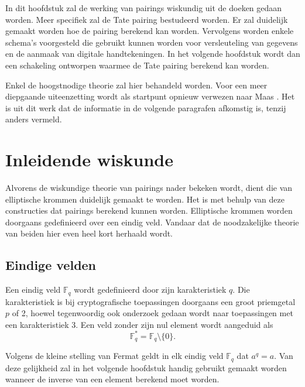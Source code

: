 
In dit hoofdstuk zal de werking van pairings wiskundig uit de doeken gedaan worden. Meer specifiek zal de Tate pairing bestudeerd worden. Er zal duidelijk gemaakt worden hoe de pairing berekend kan worden. Vervolgens worden enkele schema's voorgesteld die gebruikt kunnen worden voor versleuteling van gegevens en de aanmaak van digitale handtekeningen. In het volgende hoofdstuk wordt dan een schakeling ontworpen waarmee de Tate pairing berekend kan worden.

Enkel de hoogstnodige theorie zal hier behandeld worden. Voor een meer diepgaande uiteenzetting wordt als startpunt opnieuw verwezen naar Maas \cite{maas}. Het is uit dit werk dat de informatie in de volgende paragrafen afkomstig is, tenzij anders vermeld.

\section{Inleidende wiskunde}

Alvorens de wiskundige theorie van pairings nader bekeken wordt, dient die van elliptische krommen duidelijk gemaakt te worden. Het is met behulp van deze constructies dat pairings berekend kunnen worden. Elliptische krommen worden doorgaans gedefinieerd over een eindig veld. Vandaar dat de noodzakelijke theorie van beiden hier even heel kort herhaald wordt.

\subsection{Eindige velden}

Een eindig veld $\mathbb{F}_q$ wordt gedefinieerd door zijn karakteristiek $q$. Die karakteristiek is bij cryptografische toepassingen doorgaans een groot priemgetal $p$ of 2, hoewel tegenwoordig ook onderzoek gedaan wordt naar toepassingen met een karakteristiek 3. Een veld zonder zijn nul element wordt aangeduid als
\[\mathbb{F}_q^* = \mathbb{F}_q \setminus \{ 0 \}.\]

Volgens de kleine stelling van Fermat geldt in elk eindig veld $\mathbb{F}_q$ dat $a^q = a$. Van deze gelijkheid zal in het volgende hoofdstuk handig gebruikt gemaakt worden wanneer de inverse van een element berekend moet worden.



